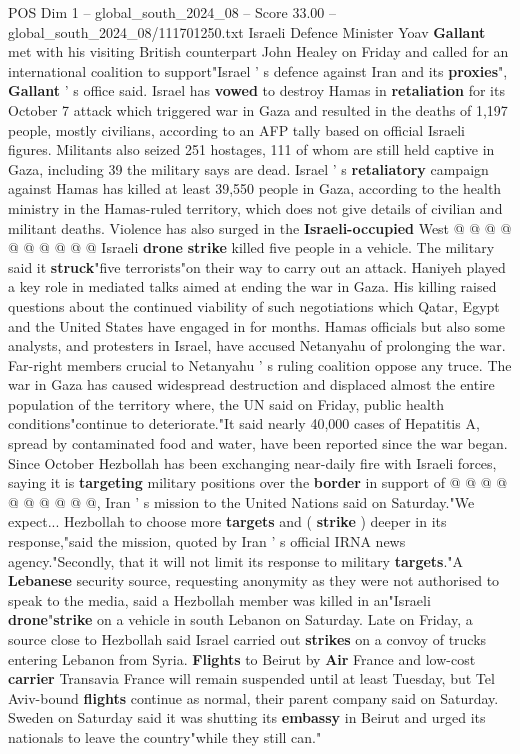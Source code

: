 \begin{textsample}{POS Dim 1 – global\_south\_2024\_08 – Score 33.00 – global\_south\_2024\_08/111701250.txt}
Israeli Defence Minister Yoav \textbf{Gallant} met with his visiting British counterpart John Healey on Friday and called for an international coalition to support"Israel ' s defence against Iran and its \textbf{proxies}", \textbf{Gallant} ' s office said.
Israel has \textbf{vowed} to destroy Hamas in \textbf{retaliation} for its October 7 attack which triggered war in Gaza and resulted in the deaths of 1,197 people, mostly civilians, according to an AFP tally based on official Israeli figures.
Militants also seized 251 hostages, 111 of whom are still held captive in Gaza, including 39 the military says are dead.
Israel ' s \textbf{retaliatory} campaign against Hamas has killed at least 39,550 people in Gaza, according to the health ministry in the Hamas-ruled territory, which does not give details of civilian and militant deaths.
Violence has also surged in the \textbf{Israeli-occupied} West @ @ @ @ @ @ @ @ @ @ Israeli \textbf{drone} \textbf{strike} killed five people in a vehicle.
The military said it \textbf{struck}"five terrorists"on their way to carry out an attack.
Haniyeh played a key role in mediated talks aimed at ending the war in Gaza.
His killing raised questions about the continued viability of such negotiations which Qatar, Egypt and the United States have engaged in for months.
Hamas officials but also some analysts, and protesters in Israel, have accused Netanyahu of prolonging the war.
Far-right members crucial to Netanyahu ' s ruling coalition oppose any truce.
The war in Gaza has caused widespread destruction and displaced almost the entire population of the territory where, the UN said on Friday, public health conditions"continue to deteriorate."It said nearly 40,000 cases of Hepatitis A, spread by contaminated food and water, have been reported since the war began.
Since October Hezbollah has been exchanging near-daily fire with Israeli forces, saying it is \textbf{targeting} military positions over the \textbf{border} in support of @ @ @ @ @ @ @ @ @ @, Iran ' s mission to the United Nations said on Saturday."We expect...
Hezbollah to choose more \textbf{targets} and ( \textbf{strike} ) deeper in its response,"said the mission, quoted by Iran ' s official IRNA news agency."Secondly, that it will not limit its response to military \textbf{targets}."A \textbf{Lebanese} security source, requesting anonymity as they were not authorised to speak to the media, said a Hezbollah member was killed in an"Israeli \textbf{drone}"\textbf{strike} on a vehicle in south Lebanon on Saturday.
Late on Friday, a source close to Hezbollah said Israel carried out \textbf{strikes} on a convoy of trucks entering Lebanon from Syria. \textbf{Flights} to Beirut by \textbf{Air} France and low-cost \textbf{carrier} Transavia France will remain suspended until at least Tuesday, but Tel Aviv-bound \textbf{flights} continue as normal, their parent company said on Saturday.
Sweden on Saturday said it was shutting its \textbf{embassy} in Beirut and urged its nationals to leave the country"while they still can."


\end{textsample}
